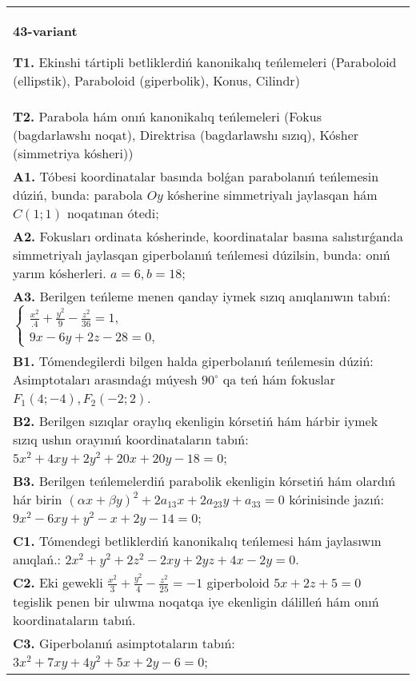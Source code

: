 \documentclass{article}
\begin{document}
\begin{tabular}{m{17cm}}
\textbf{43-variant}
\newline

\textbf{T1.} Ekinshi tártipli betliklerdiń kanonikalıq teńlemeleri (Paraboloid (ellipstik), Paraboloid (giperbolik), Konus, Cilindr) \\
\textbf{T2.} Parabola hám onıń kanonikalıq teńlemeleri (Fokus (bagdarlawshı noqat), Direktrisa (bagdarlawshı sızıq), Kósher (simmetriya kósheri)) \\
\textbf{A1.} Tóbesi koordinatalar basında bolǵan parabolanıń teńlemesin dúziń, bunda: parabola $Oy$ kósherine simmetriyalı jaylasqan hám $C (1; 1) $ noqatınan ótedi; \\
\textbf{A2.} Fokusları ordinata kósherinde, koordinatalar basına salıstırǵanda simmetriyalı jaylasqan giperbolanıń teńlemesi dúzilsin, bunda: onıń yarım kósherleri. $a=6, b=18$; \\
\textbf{A3.} Berilgen teńleme menen qanday iymek sızıq anıqlanıwın tabıń: $\left\{\begin{array}{l}\frac{x^2}{.4}+\frac{y^2}{9}-\frac{z^2}{36}=1, \\ 9 x-6 y+2 z-28=0,\end{array}\right.$ \\
\textbf{B1.} Tómendegilerdi bilgen halda giperbolanıń teńlemesin dúziń: Asimptotaları arasındaǵı múyesh $90^{\circ}$ qa teń hám fokuslar $F_1 (4;-4), F_2 (-2; 2) $. \\
\textbf{B2.} Berilgen sızıqlar oraylıq ekenligin kórsetiń hám hárbir iymek sızıq ushın orayınıń koordinataların tabıń:$5 x^2+4 x y+2 y^2+20 x+20 y-18=0$; \\
\textbf{B3.} Berilgen teńlemelerdiń parabolik ekenligin kórsetiń hám olardıń hár birin $(\alpha x+\beta y)^2+2 a_{13} x+2 a_{23} y+a_{33}=0$ kórinisinde jazıń: $9 x^2-6 x y+y^2-x+2 y-14=0$; \\
\textbf{C1.} Tómendegi betliklerdiń kanonikalıq teńlemesi hám jaylasıwın anıqlań.: $2 x^2+y^2+2 z^2-2 x y+2 y z+4 x-2 y=0$. \\
\textbf{C2.} Eki gewekli $\frac{x^2}{3}+\frac{y^2}{4}-\frac{z^2}{25}=-1$ giperboloid $5 x+2 z+5=0$ tegislik penen bir ulıwma noqatqa iye ekenligin dálilleń hám onıń koordinataların tabıń. \\
\textbf{C3.} Giperbolanıń asimptotaların tabıń: $3 x^2+7 x y+4 y^2+5 x+2 y-6=0$; \\

\end{tabular}
\vspace{1cm}
\end{document}
